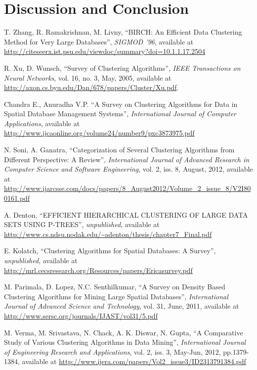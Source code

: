 \documentclass[conference, 10pt]{IEEEtran}
\begin{document}
  \section{Discussion and Conclusion}


  \newpage
  \begin{thebibliography}{1}


   T. Zhang, R. Ramakrishnan, M. Livny, ``BIRCH: An Efficient Data Clustering Method for Very Large Databases'', \emph{SIGMOD ’96}, available at
  \url{http://citeseerx.ist.psu.edu/viewdoc/summary?doi=10.1.1.17.2504}

   R. Xu, D. Wunsch, ``Survey of Clustering Algorithms'', \emph{IEEE Transactions on Neural Networks}, vol. 16, no. 3, May, 2005, available at 
  \url{http://axon.cs.byu.edu/Dan/678/papers/Cluster/Xu.pdf}.

   Chandra E., Anuradha V.P. ``A Survey on Clustering Algorithms for Data in Spatial Database Management Systems'', \emph{International Journal of Computer Applications}, available at
  \url{http://www.ijcaonline.org/volume24/number9/pxc3873975.pdf}

   N. Soni, A. Ganatra, ``Categorization of Several Clustering Algorithms from Different Perspective: A Review'', \emph{International Journal of Advanced Research in Computer Science and Software Engineering}, vol. 2, iss. 8, August, 2012, available at
  \url{http://www.ijarcsse.com/docs/papers/8_August2012/Volume_2_issue_8/V2I800161.pdf}

   A. Denton, ``EFFICIENT HIERARCHICAL CLUSTERING OF LARGE DATA SETS USING P-TREES'', \emph{unpublished}, available at
  \url{http://www.cs.ndsu.nodak.edu/~adenton/thesis/chapter7_Final.pdf}

   E. Kolatch, ``Clustering Algorithms for Spatial Databases: A Survey'', \emph{unpublished}, available at
  \url{http://mrl.cecsresearch.org/Resources/papers/Ericasurvey.pdf}

   M. Parimala, D. Lopez, N.C. Senthilkumar, ``A Survey on Density Based Clustering Algorithms for Mining Large Spatial Databases'', \emph{International Journal of Advanced Science and Technology}, vol. 31, June, 2011, available at
  \url{http://www.sersc.org/journals/IJAST/vol31/5.pdf}

   M. Verma, M. Srivastava, N. Chack, A. K. Diswar, N. Gupta, ``A Comparative Study of Various Clustering Algorithms in Data Mining'', \emph{International Journal of Engineering Research and Applications}, vol. 2, iss. 3, May-Jun, 2012, pp.1379-1384, available at
  \url{http://www.ijera.com/papers/Vol2_issue3/ID2313791384.pdf}


\end{thebibliography}
\end{document}
